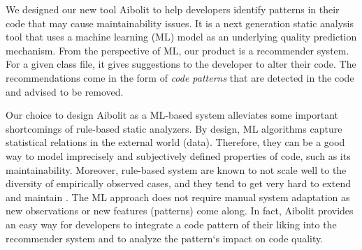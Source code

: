 We designed our new tool Aibolit to help developers identify patterns in their
code  that may cause maintainability issues. It is a next generation static
analysis tool that uses a machine learning (ML) model as an underlying quality
prediction mechanism. From the perspective of ML, our product is a recommender
system. For a given class file, it gives suggestions to the developer to alter
their code. The recommendations come in the form of \textit{code patterns} that
are detected in the code and advised to be removed.
  
Our choice to design Aibolit as a ML-based system alleviates some important
shortcomings of rule-based static analyzers. By design, ML algorithms capture
statistical relations in the external world (data). Therefore, they can be a
good way to model imprecisely and subjectively defined properties of code, such
as its maintainability. Moreover, rule-based system are known to not scale well
to the diversity of empirically observed cases, and they tend to get very hard
to extend and maintain \citep{LenatFeigenbaum1987}. The ML 
approach does not require
manual system adaptation as new observations or new features (patterns) come
along. In fact, Aibolit provides an easy way for developers to integrate a code
pattern of their liking into the recommender system and to analyze the pattern`s
impact on code quality. 







